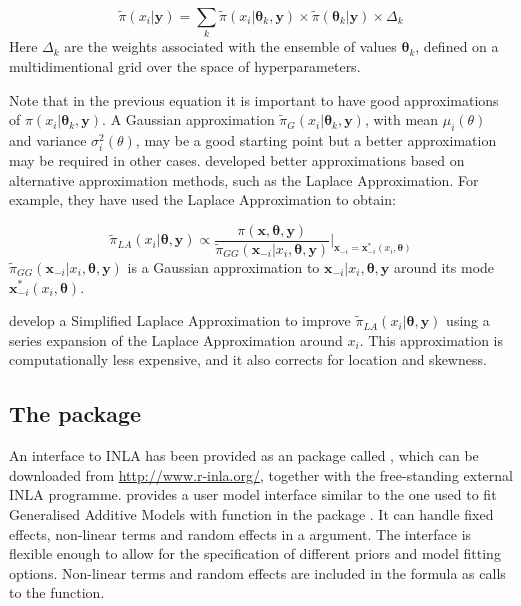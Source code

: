 \documentclass[article]{jss}
\begin{document}
\begin{equation}
\tilde\pi(x_i|\mathbf{y})= 
\sum_k \tilde\pi (x_i|\mathbf{\theta}_k, \mathbf{y})\times 
\tilde\pi(\mathbf{\theta}_k|\mathbf{y})\times \Delta_k
\end{equation}
\noindent
Here $\Delta_k$ are the weights associated with the ensemble of values
$\mathbf{\theta}_k$, defined on a multidimentional grid over
the space of hyperparameters.


Note that in the previous equation it is important to have good approximations
of $\pi (x_i|\mathbf{\theta}_k, \mathbf{y})$. A Gaussian approximation
$\tilde\pi_G (x_i|\mathbf{\theta}_k, \mathbf{y})$, with mean $\mu_i(\theta)$
and variance $\sigma^2_i(\theta)$, may be a good starting point but a better
approximation may be required in other cases. \citet{isi:000264374200002}
developed better approximations based on alternative approximation methods,
such as the Laplace Approximation.  For example, they have used the Laplace
Approximation to obtain:

\begin{equation}
\tilde\pi_{LA}(x_i|\mathbf{\theta}, \mathbf{y}) \propto 
\frac{\pi(\mathbf{x}, \mathbf{\theta}, \mathbf{y})}
{\tilde\pi_{GG}(\mathbf{x}_{-i}|x_i, \mathbf{\theta}, \mathbf{y})}
\bigg|_{\mathbf{x}_{-i}=\mathbf{x}^*_{-i}(x_i, \mathbf{\theta})}
\end{equation}
\noindent
$\tilde\pi_{GG}(\mathbf{x}_{-i}|x_i, \mathbf{\theta}, \mathbf{y})$ is a
Gaussian  approximation to $\mathbf{x}_{-i}|x_i, \mathbf{\theta}, \mathbf{y}$
around its mode $\mathbf{x}^*_{-i}(x_i, \mathbf{\theta})$.

\citet{isi:000264374200002} develop a Simplified Laplace Approximation to
improve $\tilde\pi_{LA}(x_i|\mathbf{\theta}, \mathbf{y})$ using a series
expansion of the Laplace Approximation around $x_i$. This approximation is
computationally less expensive, and it also corrects for location and
skewness.


\subsection[The R-INLA package]{The  package}

An interface to INLA has been provided as an  package called ,
which can be downloaded from \url{http://www.r-inla.org/}, together with the free-standing external INLA programme. 
provides a user model interface similar to the one used to fit Generalised Additive
Models with function  in the  package \citep{Wood:2006}. %
It can handle fixed effects, non-linear terms
and random effects in a  argument. The interface is flexible
enough to allow for the specification of different priors and model fitting
options. Non-linear terms and random effects are included in the formula as
calls to the  function. 
\end{document}
